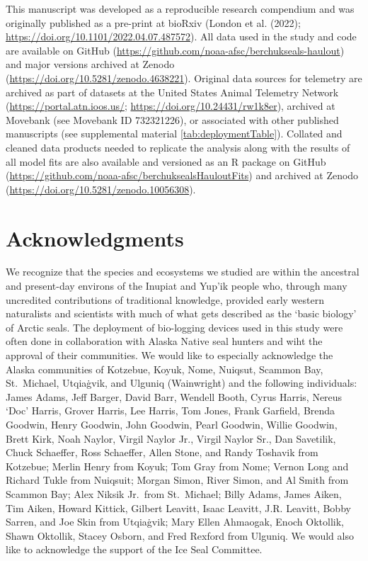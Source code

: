\documentclass[fleqn,10pt,lineno]{wlpeerj} %
\begin{document}
This manuscript was developed as a reproducible research compendium and was
originally published as a pre-print at bioRxiv (London et al. (2022);
\url{https://doi.org/10.1101/2022.04.07.487572}). All data used in the study and code
are available on GitHub (\url{https://github.com/noaa-afsc/berchukseals-haulout}) and
major versions archived at Zenodo (\url{https://doi.org/10.5281/zenodo.4638221}).
Original data sources for telemetry are archived as part of datasets at
the United States Animal Telemetry Network (\url{https://portal.atn.ioos.us/};
\url{https://doi.org/10.24431/rw1k8er}), archived at Movebank (see
Movebank ID 732321226), or associated
with other published manuscripts (see supplemental material
\ref{tab:deploymentTable}). Collated and cleaned data products needed to
replicate the analysis along with the results of all model fits are also
available and versioned as an R package on GitHub
(\url{https://github.com/noaa-afsc/berchuksealsHauloutFits}) and archived at Zenodo
(\url{https://doi.org/10.5281/zenodo.10056308}).

\section*{Acknowledgments}\label{acknowledgments}

We recognize that the species and ecosystems we studied are within the ancestral
and present-day environs of the Inupiat and Yup'ik people who, through many
uncredited contributions of traditional knowledge, provided early western
naturalists and scientists with much of what gets described as the `basic
biology' of Arctic seals. The deployment of bio-logging devices used in this
study were often done in collaboration with Alaska Native seal hunters and wiht the
approval of
their communities. We would like to especially acknowledge the Alaska communities of
Kotzebue, Koyuk, Nome, Nuiqsut, Scammon Bay, St.~Michael, Utqiaġvik, and Ulguniq
(Wainwright) and the following individuals: James Adams, Jeff Barger, David
Barr, Wendell Booth, Cyrus Harris, Nereus `Doc' Harris, Grover Harris, Lee
Harris, Tom Jones, Frank Garfield, Brenda Goodwin, Henry Goodwin, John Goodwin,
Pearl Goodwin, Willie Goodwin, Brett Kirk, Noah Naylor, Virgil Naylor Jr.,
Virgil Naylor Sr., Dan Savetilik, Chuck Schaeffer, Ross Schaeffer, Allen Stone,
and Randy Toshavik from Kotzebue; Merlin Henry from Koyuk; Tom
Gray from Nome; Vernon Long and Richard Tukle from Nuiqsuit; Morgan
Simon, River Simon, and Al Smith from Scammon Bay; Alex Niksik Jr.~from
St.~Michael; Billy Adams, James Aiken, Tim Aiken, Howard Kittick,
Gilbert Leavitt, Isaac Leavitt, J.R. Leavitt, Bobby Sarren, and Joe Skin from Utqiaġvik;
Mary Ellen Ahmaogak, Enoch Oktollik, Shawn Oktollik, Stacey Osborn, and
Fred Rexford from Ulguniq. We would also like to acknowledge the support of the
Ice Seal Committee.
\end{document}
